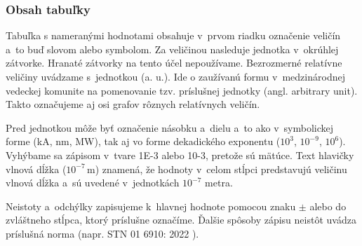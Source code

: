 \documentclass[../../../thesis.tex]{subfiles}
\begin{document}
\subsubsection{Obsah tabuľky}
Tabuľka s nameranými hodnotami obsahuje v~prvom riadku označenie
veličín a~to buď slovom alebo symbolom.
Za veličinou nasleduje jednotka v~okrúhlej zátvorke.
Hranaté zátvorky na tento účel nepoužívame.
Bezrozmerné relatívne veličiny uvádzame s~jednotkou (a. u.).
Ide o zaužívanú formu v~medzinárodnej vedeckej komunite na pomenovanie tzv. príslušnej jednotky (angl. \foreignlanguage{english}{arbitrary unit}).
Takto označujeme aj osi grafov rôznych relatívnych veličín.

Pred jednotkou môže byť označenie násobku
a~dielu a~to ako v~symbolickej forme (kA, nm, MW),
tak aj vo forme dekadického exponentu ($10^3$, $10^{-9}$, $10^6$).
Vyhýbame sa zápisom v~tvare 1E-3 alebo 10-3,
pretože sú mätúce.
Text hlavičky vlnová dĺžka ($10^{-7}$\,m) znamená,
že hodnoty v~celom stĺpci predstavujú veličinu vlnová dĺžka
a~sú uvedené v~jednotkách $10^{-7}$ metra.

Neistoty a~odchýlky zapisujeme k~hlavnej hodnote pomocou
znaku $\pm$ alebo do zvláštneho stĺpca,
ktorý príslušne označíme.
Ďalšie spôsoby zápisu neistôt uvádza príslušná norma (napr. STN 01 6910: 2022 \cite{stn016910}).
\end{document}

